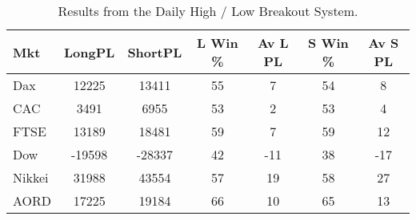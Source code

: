 \begin{table}[ht]
\centering
\caption[Results from the Daily High / Low Breakout System]{Results from the Daily High / Low Breakout System.} 
\label{tab:hl_bout_sys}
\begin{tabular}{lcccccc}
  \toprule Mkt & LongPL & ShortPL & L Win \% & Av L PL & S Win \% & Av S PL \\ 
  \midrule Dax & 12225 & 13411 & 55 & 7 & 54 & 8 \\ 
  CAC & 3491 & 6955 & 53 & 2 & 53 & 4 \\ 
  FTSE & 13189 & 18481 & 59 & 7 & 59 & 12 \\ 
  Dow & -19598 & -28337 & 42 & -11 & 38 & -17 \\ 
  Nikkei & 31988 & 43554 & 57 & 19 & 58 & 27 \\ 
  AORD & 17225 & 19184 & 66 & 10 & 65 & 13 \\ 
   \bottomrule \end{tabular}
\end{table}
